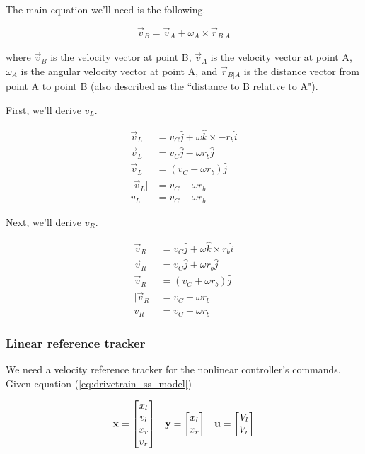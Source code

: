 The main equation we'll need is the following.

\begin{equation*}
  \vec{v}_B = \vec{v}_A + \omega_A \times \vec{r}_{B|A}
\end{equation*}

where $\vec{v}_B$ is the velocity vector at point B, $\vec{v}_A$ is the velocity
vector at point A, $\omega_A$ is the angular velocity vector at point A, and
$\vec{r}_{B|A}$ is the distance vector from point A to point B (also described
as the ``distance to B relative to A").

First, we'll derive $v_L$.

\begin{align}
  \vec{v}_L &= v_C \hat{j} + \omega \hat{k} \times -r_b \hat{i} \nonumber
    \\
  \vec{v}_L &= v_C \hat{j} - \omega r_b \hat{j} \nonumber \\
  \vec{v}_L &= (v_C - \omega r_b) \hat{j} \nonumber \\
  \lvert\vec{v}_L\rvert &= v_C - \omega r_b \nonumber \\
  v_L &= v_C - \omega r_b
\end{align}

Next, we'll derive $v_R$.

\begin{align}
  \vec{v}_R &= v_C \hat{j} + \omega \hat{k} \times r_b \hat{i} \nonumber
    \\
  \vec{v}_R &= v_C \hat{j} + \omega r_b \hat{j} \nonumber \\
  \vec{v}_R &= (v_C + \omega r_b) \hat{j} \nonumber \\
  \lvert\vec{v}_R\rvert &= v_C + \omega r_b \nonumber \\
  v_R &= v_C + \omega r_b
\end{align}

\subsubsection{Linear reference tracker}

We need a velocity \gls{reference} tracker for the nonlinear \gls{controller}'s
commands. Given equation (\ref{eq:drivetrain_ss_model})

\begin{equation*}
  \begin{array}{ccc}
    \mathbf{x} =
    \begin{bmatrix}
      x_l \\
      v_l \\
      x_r \\
      v_r
    \end{bmatrix} &
    \mathbf{y} =
    \begin{bmatrix}
      x_l \\
      x_r
    \end{bmatrix} &
    \mathbf{u} =
    \begin{bmatrix}
      V_l \\
      V_r
    \end{bmatrix}
  \end{array}
\end{equation*}

